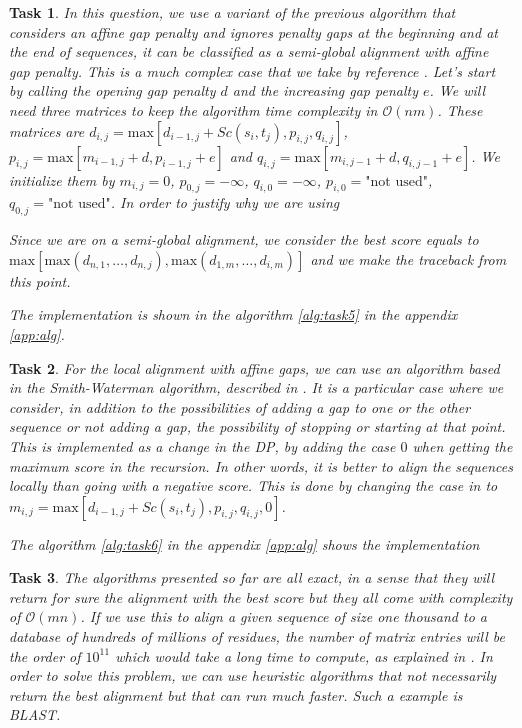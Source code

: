 \documentclass[10pt]{article} %
\theoremstyle{problemstyle}
\newtheorem{exercise}{Task}	%
\renewcommand*{\O}{\mathcal{O}}
\begin{document}
\begin{exercise} %
	\begin{sloppypar}

In this question, we use a variant of the previous algorithm that considers an affine gap penalty and ignores penalty gaps at the beginning and at the end of sequences, it can be classified as a semi-global alignment with affine gap penalty. This is a much complex case that we take by reference \cite{durbin}. Let's start by calling the opening gap penalty $d$ and the increasing gap penalty $e$. We will need three matrices to keep the algorithm time complexity in $\O(nm)$. These matrices are ${d_{i,j}=\text{max}[d_{i-1,j}+Sc(s_i,t_j), p_{i,j}, q_{i,j}]}$, ${p_{i,j}=\text{max}[m_{i-1,j}+d,p_{i-1,j}+e]}$ and ${q_{i,j}=\text{max}[m_{i,j-1}+d,q_{i,j-1}+e]}$. We initialize them by $m_{i,j}=0$, $p_{0,j}=-\infty$, $q_{i,0}=-\infty$, $p_{i,0}=\text{"not used"}$, $q_{0,j}=\text{"not used"}$. In order to justify why we are using 

Since we are on a semi-global alignment, we consider the best score equals to ${\text{max}[\text{max}(d_{n,1},\dots,d_{n,j}),\text{max}(d_{1,m},\dots ,d_{i,m})]}$ and we make the traceback from this point.
\end{sloppypar}

The implementation is shown in the algorithm \ref{alg:task5} in the appendix \ref{app:alg}.

\end{exercise}

\begin{exercise} %
For the local alignment with affine gaps, we can use an algorithm based in the Smith-Waterman algorithm, described in \cite{durbin}. It is a particular case where we consider, in addition to the possibilities of adding a gap to one or the other sequence or not adding a gap, the possibility of stopping or starting at that point. This is implemented as a change in the DP, by adding the case $0$ when getting the maximum score in the recursion. In other words, it is better to align the sequences locally than going with a negative score. This is done by changing the case in  to ${m_{i,j}=\text{max}[d_{i-1,j}+Sc(s_i,t_j), p_{i,j}, q_{i,j},0]}$.

The algorithm \ref{alg:task6} in the appendix \ref{app:alg} shows the implementation

\end{exercise}

\begin{exercise} %
The algorithms presented so far are all exact, in a sense that they will return for sure the alignment with the best score but they all come with complexity of $\O(mn)$. If we use this to align a given sequence of size one thousand to a database of hundreds of millions of residues, the number of matrix entries will be the order of $10^{11}$ which would take a long time to compute, as explained in \cite{durbin}. In order to solve this problem, we can use heuristic algorithms that not necessarily return the best alignment but that can run much faster. Such a example is BLAST.
\end{exercise}
\end{document}
